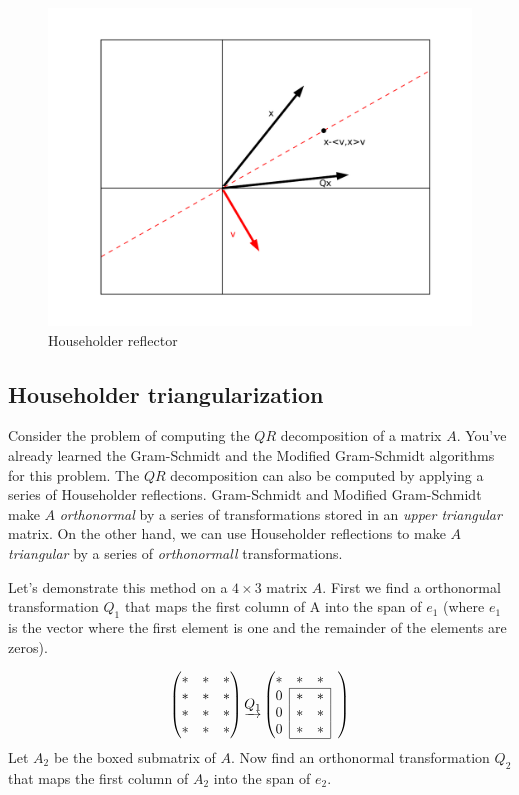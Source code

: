 \begin{figure}
\includegraphics[width= \textwidth]{fig1}
\caption{Householder reflector}
\label{fig:Householder_reflector}
\end{figure}

\subsection*{Householder triangularization}
Consider the problem of computing the $QR$ decomposition of a matrix $A$.
You've already learned the Gram-Schmidt and the Modified Gram-Schmidt algorithms for this problem.
The $QR$ decomposition can also be computed by applying a series of Householder reflections.
Gram-Schmidt and Modified Gram-Schmidt make $A$ \emph{orthonormal} by a series of transformations stored in an \emph{upper triangular} matrix.
On the other hand, we can use Householder reflections to make $A$ \emph{triangular} by a series of \emph{orthonormall} transformations.

Let's demonstrate this method on a $4 \times 3$ matrix $A$.
First we find a orthonormal transformation $Q_1$ that maps the first column of A into the span of $e_1$
(where $e_1$ is the vector where the first element is one and the remainder of the elements are zeros).

\def\mc#1{\multicolumn{1}{c|}{#1}}
\begin{equation*}
\begin{pmatrix}
* & * & * \\
* & * & * \\
* & * & * \\
* & * & * 
\end{pmatrix}
\underrightarrow{Q_1}
\begin{pmatrix}

* & * & * & \\ \cline{2-3}
\mc{0} & * & \mc{*}& \\
\mc{0} & * & \mc{*} & \\
\mc{0}& * & \mc{*} & \\ \cline{2-3}
\end{pmatrix}
\end{equation*}
Let $A_2$ be the boxed submatrix of $A$.
Now find an orthonormal transformation $Q_2$ that maps the first column of $A_2$ into the span of $e_2$.

